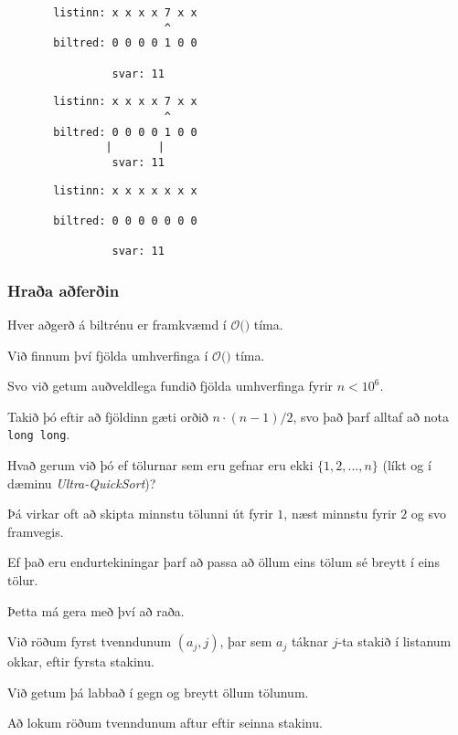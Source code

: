 { \begin{verbatim}
       listinn: x x x x 7 x x
                        ^
       biltred: 0 0 0 0 1 0 0

                svar: 11
\end{verbatim}}
{ \begin{verbatim}
       listinn: x x x x 7 x x
                        ^
       biltred: 0 0 0 0 1 0 0
               |       |
                svar: 11
\end{verbatim}}
{ \begin{verbatim}
       listinn: x x x x x x x

       biltred: 0 0 0 0 0 0 0

                svar: 11
\end{verbatim}}
{
	\frametitle{Hraða aðferðin}
}

{
}

{
	{
		\item<1-> Hver aðgerð á biltrénu er framkvæmd í $\mathcal{O}($$)$ tíma.
		\item<3-> Við finnum því fjölda umhverfinga í $\mathcal{O}($$)$ tíma.
		\item<4-> Svo við getum auðveldlega fundið fjölda umhverfinga fyrir $n < 10^6$.
		\item<5-> Takið þó eftir að fjöldinn gæti orðið $n \cdot (n - 1)/2$, svo það þarf alltaf að nota \texttt{long long}.
	}
}

{
	{
		\item<1-> Hvað gerum við þó ef tölurnar sem eru gefnar eru ekki $\{1, 2, ..., n\}$ (líkt og í dæminu \emph{Ultra-QuickSort})?
		\item<2-> Þá virkar oft að skipta minnstu tölunni út fyrir $1$, næst minnstu fyrir $2$ og svo framvegis.
		\item<3-> Ef það eru endurtekiningar þarf að passa að öllum eins tölum sé breytt í eins tölur.
		\item<4-> Þetta má gera með því að raða.
		\item<5-> Við röðum fyrst tvenndunum $(a_j, j)$, þar sem $a_j$ táknar $j$-ta stakið í listanum okkar, eftir fyrsta stakinu.
		\item<6-> Við getum þá labbað í gegn og breytt öllum tölunum.
		\item<7-> Að lokum röðum tvenndunum aftur eftir seinna stakinu.
	}
}

